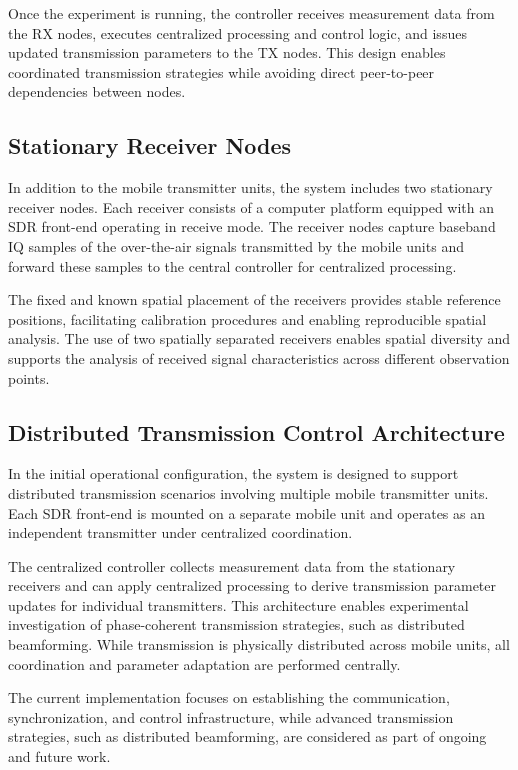 \documentclass[conference,a4paper]{IEEEtran}
\begin{document}
Once the experiment is running, the controller receives measurement data from the RX nodes, executes centralized processing and control logic, and issues updated transmission parameters to the TX nodes. This design enables coordinated transmission strategies while avoiding direct peer-to-peer dependencies between nodes.

\subsection{Stationary Receiver Nodes}

In addition to the mobile transmitter units, the system includes two stationary receiver nodes. Each receiver consists of a computer platform equipped with an SDR front-end operating in receive mode. The receiver nodes capture baseband IQ samples of the over-the-air signals transmitted by the mobile units and forward these samples to the central controller for centralized processing.

The fixed and known spatial placement of the receivers provides stable reference positions, facilitating calibration procedures and enabling reproducible spatial analysis. The use of two spatially separated receivers enables spatial diversity and supports the analysis of received signal characteristics across different observation points.


\subsection{Distributed Transmission Control Architecture}

In the initial operational configuration, the system is designed to support distributed transmission scenarios involving multiple mobile transmitter units. Each SDR front-end is mounted on a separate mobile unit and operates as an independent transmitter under centralized coordination.

The centralized controller collects measurement data from the stationary receivers and can apply centralized processing to derive transmission parameter updates for individual transmitters. 
This architecture enables experimental investigation of phase-coherent transmission strategies, such as distributed beamforming. While transmission is physically distributed across mobile units, all coordination
and parameter adaptation are performed centrally.

The current implementation focuses on establishing the communication,
synchronization, and control infrastructure, while advanced transmission strategies,
such as distributed beamforming, are considered as part of ongoing and future work.
\end{document}
